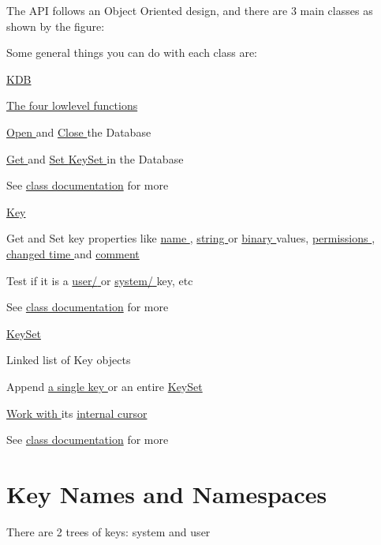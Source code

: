 The API follows an Object Oriented design, and there are 3 main classes as shown by the figure:

 Some general things you can do with each class are:

\hyperlink{group__kdb}{KDB }
\begin{DoxyItemize}
\item \hyperlink{group__kdb}{The four lowlevel functions }
\item \hyperlink{group__kdb_ga6808defe5870f328dd17910aacbdc6ca}{Open } and \hyperlink{group__kdb_gadb54dc9fda17ee07deb9444df745c96f}{Close } the Database
\item \hyperlink{group__kdb_ga28e385fd9cb7ccfe0b2f1ed2f62453a1}{Get } and \hyperlink{group__kdb_ga11436b058408f83d303ca5e996832bcf}{Set } \hyperlink{group__keyset}{KeySet } in the Database
\item See \hyperlink{group__kdb}{class documentation} for more
\end{DoxyItemize}

\hyperlink{group__key}{Key }
\begin{DoxyItemize}
\item Get and Set key properties like \hyperlink{group__keyname_ga7699091610e7f3f43d2949514a4b35d9}{name }, \hyperlink{group__keyvalue_ga622bde1eb0e0c4994728331326340ef2}{string } or \hyperlink{group__keyvalue_gaa50a5358fd328d373a45f395fa1b99e7}{binary } values, \hyperlink{group__keymeta_gabc0cec592ce3b77e9bc33dbc8e8f6bdc}{permissions }, \hyperlink{group__keymeta_ga57689eb5691679071463b777ae786ae9}{changed time } and \hyperlink{group__keyvalue_gafb89735689929ff717cc9f2d0d0b46a2}{comment }
\item Test if it is a \hyperlink{group__keytest_ga373acc20c6209357045891f4b0c70041}{{\ttfamily user/} } or \hyperlink{group__keytest_gafe49cfb61c2accb3073131c23a56fb14}{{\ttfamily system/} } key, etc
\item See \hyperlink{group__key}{class documentation} for more
\end{DoxyItemize}

\hyperlink{group__keyset}{KeySet }
\begin{DoxyItemize}
\item Linked list of Key objects
\item Append \hyperlink{group__keyset_gaa5a1d467a4d71041edce68ea7748ce45}{a single key } or an entire \hyperlink{group__keyset_ga21eb9c3a14a604ee3a8bdc779232e7b7}{KeySet }
\item \hyperlink{group__keyset_ga317321c9065b5a4b3e33fe1c399bcec9}{Work with } its \hyperlink{group__keyset_ga4287b9416912c5f2ab9c195cb74fb094}{internal cursor }
\item See \hyperlink{group__keyset}{class documentation} for more
\end{DoxyItemize}\hypertarget{index_keynames}{}\section{Key Names and Namespaces}\label{index_keynames}
There are 2 trees of keys: {\ttfamily system} and {\ttfamily user} 


